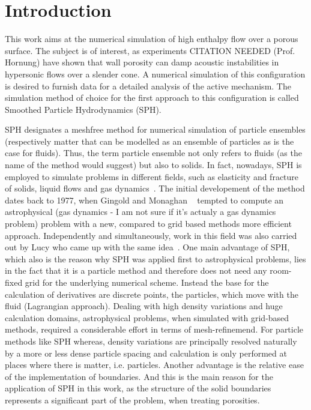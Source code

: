 \documentclass{report}
\begin{document}
%



\tableofcontents
\chapter{Introduction}
\label{sec:intro}


This work aims at the numerical simulation of high enthalpy flow over a porous
surface. The subject is of interest, as experiments CITATION
NEEDED (Prof. Hornung) have shown that wall porosity can damp
acoustic instabilities in hypersonic flows over a slender cone. A numerical
simulation of this configuration is desired to furnish data for a detailed
analysis of the active mechanism. The simulation method of choice for the first approach
to this configuration is called Smoothed Particle Hydrodynamics (SPH). 

SPH designates a meshfree method for numerical simulation of particle
ensembles (respectively matter that can be modelled as an ensemble of
particles as is the case for fluids).
Thus, the term particle ensemble not only refers
to fluids (as the name of the method would suggest) but also to solids. In
fact, nowadays, SPH is employed to simulate problems in different fields,
such as elasticity and fracture of solids, liquid flows and gas
dynamics~\cite{Monaghan2005}.
The initial developement of the method dates back to 1977, when Gingold and
Monaghan ~\cite{Gingold1977} tempted to compute an astrophysical (gas dynamics - I am not sure if it's actualy a gas dynamics problem) problem with a new, compared to grid based methods more efficient approach. Independently and simultaneously, work in this field was also carried out by Lucy who came up with the same idea~\cite{Lucy1977}. One main advantage of SPH, which also is the reason why SPH was applied first to astrophysical problems, lies in the fact that it is a particle method and therefore does not need any room-fixed grid for the underlying numerical scheme. Instead
the base for the calculation of derivatives are discrete points, the particles, which move with the fluid (Lagrangian approach). Dealing with high density variations and huge calculation domains, astrophysical problems, when simulated with grid-based methods, 
required a considerable effort in terms of mesh-refinemend. For particle methods like SPH whereas, density variations are principally resolved naturally by a more or less dense particle spacing and calculation is only performed at places where there is matter, i.e. particles.
Another advantage is the relative ease of the
implementation of boundaries. And this is the main reason for the application of SPH in this work, as the structure of the solid boundaries represents a significant part of the problem, when treating porosities. 
 
\end{document}

